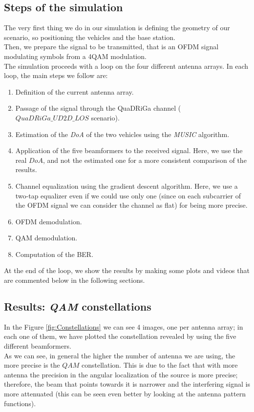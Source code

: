 \subsection{Steps of the simulation}

The very first thing we do in our simulation is defining the geometry of our scenario, so positioning the vehicles and the base station.\\
Then, we prepare the signal to be transmitted, that is an OFDM signal modulating symbols from a 4\-QAM modulation.\\
The simulation proceeds with a loop on the four different antenna arrays. In each loop, the main steps we follow are:

\begin{enumerate}
    \item Definition of the current antenna array.
    \item Passage of the signal through the QuaDRiGa channel ($QuaDRiGa\_UD2D\_LOS$ scenario).
    \item Estimation of the \textit{DoA} of the two vehicles using the \textit{MUSIC} algorithm.
    \item Application of the five beamformers to the received signal. Here, we use the real $DoA$, and not the estimated one
            for a more consistent comparison of the results.
    \item Channel equalization using the gradient descent algorithm. Here, we use a two-tap equalizer even if we could use only one 
            (since on each subcarrier of the OFDM signal we can consider the channel as flat) for being more precise.
    \item OFDM demodulation.
    \item QAM demodulation.
    \item Computation of the BER.
\end{enumerate}

At the end of the loop, we show the results by making some plots and videos that are commented below in the following sections.

\subsection{Results: \textit{QAM} constellations}

In the Figure \ref{fig:Constellations} we can see 4 images, one per antenna array; in each one of them, we have
plotted the constellation revealed by using the five different beamformers. \\ 
As we can see, in general the higher the number of antenna we are using, the more precise is the $QAM$ constellation. This
is due to the fact that with more antenna the precision in the angular localization of the source is more precise; therefore, 
the beam that points towards it is narrower and the interfering signal is more attenuated (this can be seen even better by
looking at the antenna pattern functions).

